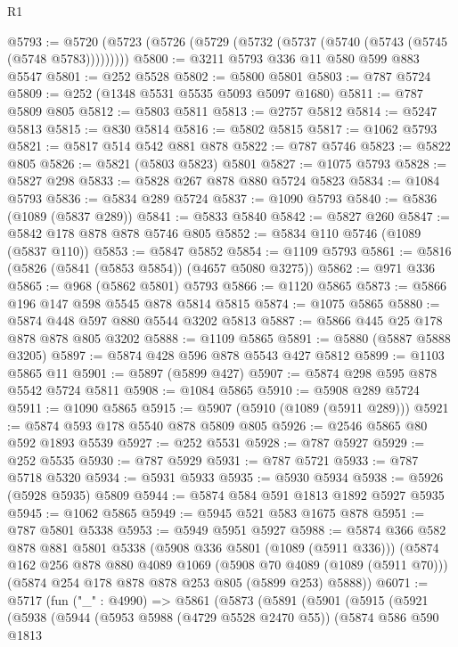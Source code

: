 \begin{lexlean}{R1}
\begin{coremodule}
@5793 := @5720 (@5723 (@5726 (@5729 (@5732 (@5737 (@5740 (@5743 (@5745 (@5748 @5783)))))))))
@5800 := @3211 @5793 @336 @11 @580 @599 @883 @5547
@5801 := @252 @5528
@5802 := @5800 @5801
@5803 := @787 @5724
@5809 := @252 (@1348 @5531 @5535 @5093 @5097 @1680)
@5811 := @787 @5809 @805
@5812 := @5803 @5811
@5813 := @2757 @5812
@5814 := @5247 @5813
@5815 := @830 @5814
@5816 := @5802 @5815
@5817 := @1062 @5793
@5821 := @5817 @514 @542 @881 @878
@5822 := @787 @5746
@5823 := @5822 @805
@5826 := @5821 (@5803 @5823) @5801
@5827 := @1075 @5793
@5828 := @5827 @298
@5833 := @5828 @267 @878 @880 @5724 @5823
@5834 := @1084 @5793
@5836 := @5834 @289 @5724
@5837 := @1090 @5793
@5840 := @5836 (@1089 (@5837 @289))
@5841 := @5833 @5840
@5842 := @5827 @260
@5847 := @5842 @178 @878 @878 @5746 @805
@5852 := @5834 @110 @5746 (@1089 (@5837 @110))
@5853 := @5847 @5852
@5854 := @1109 @5793
@5861 := @5816 (@5826 (@5841 (@5853 @5854)) (@4657 @5080 @3275))
@5862 := @971 @336
@5865 := @968 (@5862 @5801) @5793
@5866 := @1120 @5865
@5873 := @5866 @196 @147 @598 @5545 @878 @5814 @5815
@5874 := @1075 @5865
@5880 := @5874 @448 @597 @880 @5544 @3202 @5813
@5887 := @5866 @445 @25 @178 @878 @878 @805 @3202
@5888 := @1109 @5865
@5891 := @5880 (@5887 @5888 @3205)
@5897 := @5874 @428 @596 @878 @5543 @427 @5812
@5899 := @1103 @5865 @11
@5901 := @5897 (@5899 @427)
@5907 := @5874 @298 @595 @878 @5542 @5724 @5811
@5908 := @1084 @5865
@5910 := @5908 @289 @5724
@5911 := @1090 @5865
@5915 := @5907 (@5910 (@1089 (@5911 @289)))
@5921 := @5874 @593 @178 @5540 @878 @5809 @805
@5926 := @2546 @5865 @80 @592 @1893 @5539
@5927 := @252 @5531
@5928 := @787 @5927
@5929 := @252 @5535
@5930 := @787 @5929
@5931 := @787 @5721
@5933 := @787 @5718 @5320
@5934 := @5931 @5933
@5935 := @5930 @5934
@5938 := @5926 (@5928 @5935) @5809
@5944 := @5874 @584 @591 @1813 @1892 @5927 @5935
@5945 := @1062 @5865
@5949 := @5945 @521 @583 @1675 @878
@5951 := @787 @5801 @5338
@5953 := @5949 @5951 @5927
@5988 := @5874
    @366
    @582
    @878
    @881
    @5801
    @5338
    (@5908 @336 @5801 (@1089 (@5911 @336)))
    (@5874
      @162
      @256
      @878
      @880
      @4089
      @1069
      (@5908 @70 @4089 (@1089 (@5911 @70)))
      (@5874 @254 @178 @878 @878 @253 @805 (@5899 @253) @5888))
@6071 := @5717
    (fun ("_" : @4990) =>
    @5861
      (@5873
        (@5891
          (@5901
            (@5915
              (@5921
                (@5938
                  (@5944
                    (@5953 @5988 (@4729 @5528 @2470 @55))
                    (@5874
                      @586
                      @590
                      @1813

\end{coremodule}
\end{lexlean}
